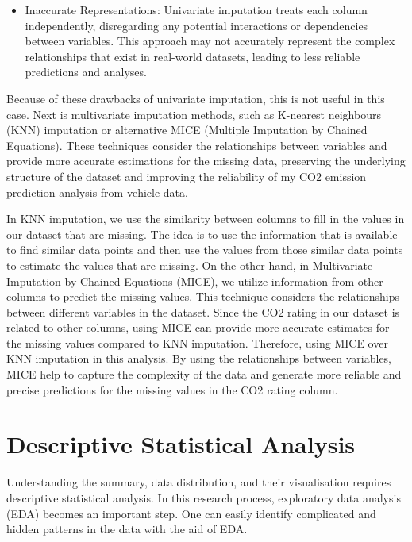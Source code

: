 \documentclass[12pt, a4paper,oneside]{book}
\numberwithin{equation}{section}
\begin{document}
\begin{itemize}
    \item Inaccurate Representations: Univariate imputation treats each column independently, disregarding any potential interactions or dependencies between variables. This approach may not accurately represent the complex relationships that exist in real-world datasets, leading to less reliable predictions and analyses.
\end{itemize}

Because of these drawbacks of univariate imputation, this is not useful in this case. Next is multivariate imputation methods, such as K-nearest neighbours (KNN) imputation or alternative MICE (Multiple Imputation by Chained Equations). These techniques consider the relationships between variables and provide more accurate estimations for the missing data, preserving the underlying structure of the dataset and improving the reliability of my CO2 emission prediction analysis from vehicle data.~\cite{ref8}

In KNN imputation, we use the similarity between columns to fill in the values in our dataset that are missing. The idea is to use the information that is available to find similar data points and then use the values from those similar data points to estimate the values that are missing. On the other hand, in Multivariate Imputation by Chained Equations (MICE), we utilize information from other columns to predict the missing values. This technique considers the relationships between different variables in the dataset. Since the CO2 rating in our dataset is related to other columns, using MICE can provide more accurate estimates for the missing values compared to KNN imputation. Therefore, using MICE over KNN imputation in this analysis. By using the relationships between variables, MICE help to capture the complexity of the data and generate more reliable and precise predictions for the missing values in the CO2 rating column.~\cite{ref8}

\section{Descriptive Statistical Analysis}


Understanding the summary, data distribution, and their visualisation requires descriptive statistical analysis. In this research process, exploratory data analysis (EDA) becomes an important step. One can easily identify complicated and hidden patterns in the data with the aid of EDA.
\end{document}
